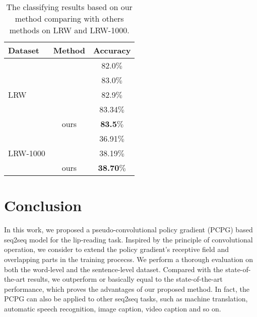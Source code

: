 \documentclass[a4paper, 10pt, conference]{ieeeconf}      %
\begin{document}
\vspace{-0.4cm}
\begin{table}[H]
	\caption{The classifying results based on our method comparing with others methods on LRW and LRW-1000. 
		\vspace{-0.2cm}} \label{table6}
	\setlength{\abovecaptionskip}{0.1cm}   %
	\setlength{\belowcaptionskip}{0cm} 
	\centering
	\begin{tabular}{|p{1.39cm}|c|c|}    
		\hline
		Dataset & Method&  Accuracy \\
		\hline
		\hline
		\multirow{5}{*}{LRW}&\cite{Petridis2018}  & 82.0$\%$  \\
		~&\cite{Stafylakis2017} & 83.0$\%$ \\
		~&\cite{Stafylakis2018}&{82.9}$\%$  \\
		~&\cite{Wang2019}&{83.34}$\%$  \\
		~&ours& \textbf{83.5}$\%$  \\
		\hline
		\multirow{3}{*}{LRW-1000}& \cite{Wang2019}& {36.91}$\%$    \\  
		~&	\cite{Yang2019} & 38.19$\%$ \\
		~&ours  & \textbf{38.70}$\%$    \\
	
		\hline
	\end{tabular}
	
\end{table}


\section{Conclusion}
In this work, we proposed a pseudo-convolutional policy gradient (PCPG) based seq2seq model for the lip-reading task. Inspired by the principle of convolutional operation, we consider to extend the policy gradient's receptive field and overlapping parts in the training procecss. We perform a thorough evaluation on both the word-level and the sentence-level dataset. Compared with the state-of-the-art results, we outperform or basically equal to the state-of-the-art performance, which proves the advantages of our proposed method. In fact, the PCPG can also be applied to other seq2seq tasks, such as machine translation, automatic speech recognition, image caption, video caption and so on. 



\end{document}

